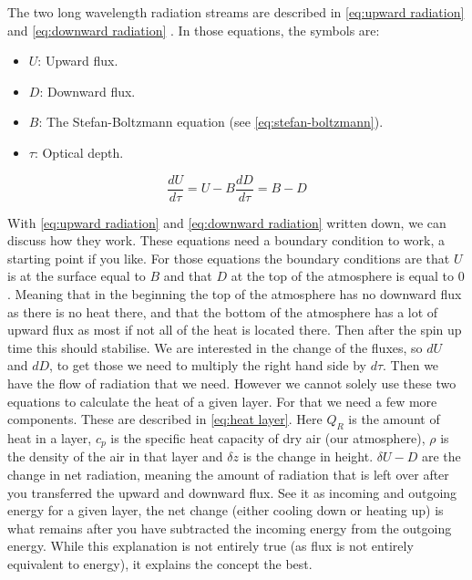The two long wavelength radiation streams are described in \autoref{eq:upward radiation} and \autoref{eq:downward radiation} \cite{greyRad}. In those equations, the symbols are:

\begin{itemize}
    \item $U$: Upward flux.
    \item $D$: Downward flux.
    \item $B$: The Stefan-Boltzmann equation (see \autoref{eq:stefan-boltzmann}).
    \item $\tau$: Optical depth.
\end{itemize}

\begin{subequations}
    \begin{equation}
        \label{eq:upward radiation}
        \frac{dU}{d\tau} = U - B
    \end{equation}
    \begin{equation}
        \label{eq:downward radiation}
        \frac{dD}{d\tau} = B - D
    \end{equation}
\end{subequations}

With \autoref{eq:upward radiation} and \autoref{eq:downward radiation} written down, we can discuss how they work. These equations need a boundary condition to work, a starting point if you like.
For those equations the boundary conditions are that $U$ is at the surface equal to $B$ and that $D$ at the top of the atmosphere is equal to $0$. Meaning that in the beginning the top of the 
atmosphere has no downward flux as there is no heat there, and that the bottom of the atmosphere has a lot of upward flux as most if not all of the heat is located there. Then after the spin up 
time this should stabilise. We are interested in the change of the fluxes, so $dU$ and $dD$, to get those we need to multiply the right hand side by $d\tau$. Then we have the flow of radiation
that we need. However we cannot solely use these two equations to calculate the heat of a given layer. For that we need a few more components. These are described in \autoref{eq:heat layer}. 
Here $Q_R$ is the amount of heat in a layer, $c_p$ is the specific heat capacity of dry air (our atmosphere), $\rho$ is the density of the air in that layer and $\delta z$ is the change in height. 
$\delta U - D$ are the change in net radiation, meaning the amount of radiation that is left over after you transferred the upward and downward flux. See it as incoming and outgoing energy for a 
given layer, the net change (either cooling down or heating up) is what remains after you have subtracted the incoming energy from the outgoing energy. While this explanation is not entirely true 
(as flux is not entirely equivalent to energy), it explains the concept the best.

